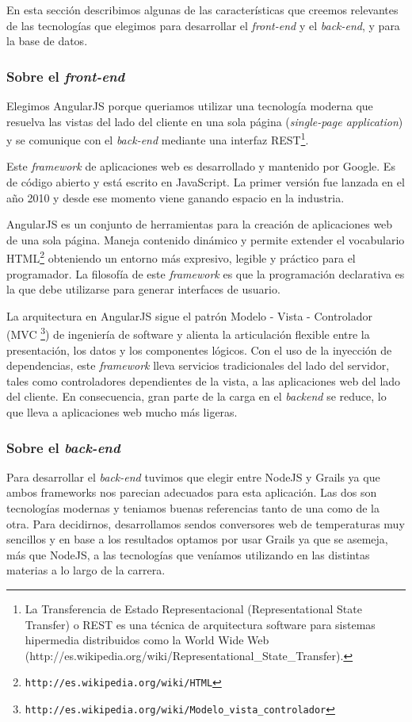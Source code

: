 En esta sección describimos algunas de las características que creemos relevantes de las tecnologías que elegimos para desarrollar el \textit{front-end} y el \textit{back-end}, y para la base de datos.

\subsubsection{Sobre el \textit{front-end}}
Elegimos AngularJS porque queriamos utilizar una tecnología moderna que resuelva las vistas del lado del cliente en una sola página (\textit{single-page application}) y se comunique con el \textit{back-end} mediante una interfaz REST\footnote{La Transferencia de Estado Representacional (Representational State Transfer) o REST es una técnica de arquitectura software para sistemas hipermedia distribuidos como la World Wide Web (http://es.wikipedia.org/wiki/Representational\_State\_Transfer).}.

Este \textit{framework} de aplicaciones web es desarrollado y mantenido por Google. Es de código abierto y está escrito en JavaScript. La primer versión fue lanzada en el año 2010 y desde ese momento viene ganando espacio en la industria. 

AngularJS es un conjunto de herramientas para la creación de aplicaciones web de una sola página. Maneja contenido dinámico y permite extender el vocabulario HTML\footnote{\texttt{http://es.wikipedia.org/wiki/HTML}} obteniendo un entorno más expresivo, legible y práctico para el programador. La filosofía de este \textit{framework} es que la programación declarativa es la que debe utilizarse para generar interfaces de usuario.

La arquitectura en AngularJS sigue el patrón Modelo - Vista - Controlador (MVC  \footnote{\texttt{http://es.wikipedia.org/wiki/Modelo\_vista\_controlador}}) de ingeniería de software y alienta la articulación flexible entre la presentación, los datos y los componentes lógicos. Con el uso de la inyección de dependencias, este \textit{framework} lleva servicios tradicionales del lado del servidor, tales como controladores dependientes de la vista, a las aplicaciones web del lado del cliente. En consecuencia, gran parte de la carga en el \textit{backend} se reduce, lo que lleva a aplicaciones web mucho más ligeras.

\subsubsection{Sobre el \textit{back-end}}
Para desarrollar el \textit{back-end} tuvimos que elegir entre NodeJS y Grails ya que ambos frameworks nos parecian adecuados para esta aplicación. Las dos son tecnologías modernas y teniamos buenas referencias tanto de una como de la otra. Para decidirnos, desarrollamos sendos conversores web de temperaturas muy sencillos y en base a los resultados optamos por usar Grails ya que se asemeja, más que NodeJS, a las tecnologías que veníamos utilizando en las distintas materias a lo largo de la carrera.

